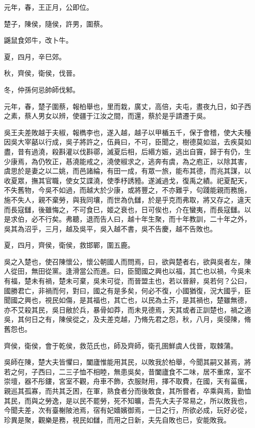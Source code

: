 
\begin{pinyinscope}
元年，春，王正月，公即位。

楚子，陳侯，隨侯，許男，圍蔡。

鼷鼠食郊牛，改卜牛。

夏，四月，辛巳郊。

秋，齊侯，衛侯，伐晉。

冬，仲孫何忌帥師伐邾。

元年，春，楚子圍蔡，報柏舉也，里而栽，廣丈，高倍，夫屯，晝夜九日，如子西之素，蔡人男女以辨，使疆于江汝之間，而還，蔡於是乎請遷于吳。

吳王夫差敗越于夫椒，報檇李也，遂入越，越子以甲楯五千，保于會稽，使大夫種因吳大宰嚭以行成，吳子將許之，伍員曰，不可，臣聞之，樹德莫如滋，去疾莫如盡，昔有過澆，殺斟灌以伐斟鄩，滅夏后相，后緡方娠，逃出自竇，歸于有仍，生少康焉，為仍牧正，惎澆能戒之，澆使椒求之，逃奔有虞，為之庖正，以除其害，虞思於是妻之以二姚，而邑諸綸，有田一成，有眾一旅，能布其德，而兆其謀，以收夏眾，撫其官職，使女艾諜澆，使季杼誘豷。遂滅過戈，復禹之績。祀夏配天，不失舊物，今吳不如過，而越大於少康，或將豐之，不亦難乎，句踐能親而務施，施不失人，親不棄勞，與我同壤，而世為仇讎，於是乎克而弗取，將又存之，違天而長寇讎，後雖悔之，不可食巳，姬之衰也，日可俟也，介在蠻夷，而長寇讎。以是求伯，必不行矣。弗聽，退而告人曰，越十年生聚，而十年教訓，二十年之外，吳其為沼乎，三月，越及吳平，吳入越不書，吳不告慶，越不告敗也。

夏，四月，齊侯，衛侯，救邯鄲，圍五鹿。

吳之入楚也，使召陳懷公，懷公朝國人而問焉，曰，欲與楚者右，欲與吳者左，陳人從田，無田從黨。逢滑當公而進。曰，臣聞國之興也以福，其亡也以禍，今吳未有福，楚未有禍，楚未可棄，吳未可從，而晉盟主也，若以晉辭，吳若何？公曰，國勝君亡，非禍而何，對曰，國之有是多矣，何必不復，小國猶復，況大國乎，臣聞國之興也，視民如傷，是其福也，其亡也，以民為土芥，是其禍也，楚雖無德，亦不艾殺其民，吳日敝於兵，暴骨如莽，而未見德焉，天其或者正訓楚也，禍之適吳，其何日之有，陳侯從之，及夫差克越，乃脩先君之怨，秋，八月，吳侵陳，脩舊怨也。

齊侯，衛侯，會于乾侯，救范氏也，師及齊師，衛孔圉鮮虞人伐晉，取棘蒲。

吳師在陳，楚大夫皆懼曰，闔廬惟能用其民，以敗我於柏舉，今聞其嗣又甚焉，將若之何，子西曰，二三子恤不相睦，無患吳矣，昔闔廬食不二味，居不重席，室不崇壇，器不彤鏤，宮室不觀，舟車不飾，衣服財用，擇不取費，在國，天有菑癘，親巡其孤寡，而共其乏困，在軍，熟食者分而後敢食，其所嘗者，卒乘與焉，勤恤其民，而與之勞逸，是以民不罷勞，死不知曠，吾先大夫子常易之，所以敗我也，今聞夫差，次有臺榭陂池焉，宿有妃嬙嬪御焉，一日之行，所欲必成，玩好必從，珍異是聚，觀樂是務，視民如讎，而用之日新，夫先自敗也已，安能敗我。


\end{pinyinscope}
